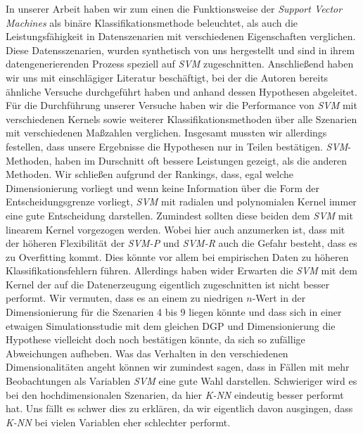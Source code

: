 \documentclass[
]{article}
\begin{document}
In unserer Arbeit haben wir zum einen die Funktionsweise der
\textit{Support Vector Machines} als binäre Klassifikationsmethode
beleuchtet, als auch die Leistungsfähigkeit in Datenszenarien mit
verschiedenen Eigenschaften verglichen. Diese Datensszenarien, wurden
synthetisch von uns hergestellt und sind in ihrem datengenerierenden
Prozess speziell auf \textit{SVM} zugeschnitten. Anschließend haben wir
uns mit einschlägiger Literatur beschäftigt, bei der die Autoren bereits
ähnliche Versuche durchgeführt haben und anhand dessen Hypothesen
abgeleitet. Für die Durchführung unserer Versuche haben wir die
Performance von \textit{SVM} mit verschiedenen Kernels sowie weiterer
Klassifikationsmethoden über alle Szenarien mit verschiedenen Maßzahlen
verglichen. \newline  Insgesamt mussten wir allerdings festellen, dass
unsere Ergebnisse die Hypothesen nur in Teilen bestätigen.
\textit{SVM}-Methoden, haben im Durschnitt oft bessere Leistungen
gezeigt, als die anderen Methoden. Wir schließen aufgrund der Rankings,
dass, egal welche Dimensionierung vorliegt und wenn keine Information
über die Form der Entscheidungsgrenze vorliegt, \textit{SVM} mit
radialen und polynomialen Kernel immer eine gute Entscheidung
darstellen. Zumindest sollten diese beiden dem \textit{SVM} mit linearem
Kernel vorgezogen werden. Wobei hier auch anzumerken ist, dass mit der
höheren Flexibilität der \textit{SVM-P} und \textit{SVM-R} auch die
Gefahr besteht, dass es zu Overfitting kommt. Dies könnte vor allem bei
empirischen Daten zu höheren Klassifikationsfehlern führen.\newline
Allerdings haben wider Erwarten die \textit{SVM} mit dem Kernel der auf
die Datenerzeugung eigentlich zugeschnitten ist nicht besser performt.
Wir vermuten, dass es an einem zu niedrigen \(n\)-Wert in der
Dimensionierung für die Szenarien 4 bis 9 liegen könnte und dass sich in
einer etwaigen Simulationsstudie mit dem gleichen DGP und
Dimensionierung die Hypothese vielleicht doch noch bestätigen könnte, da
sich so zufällige Abweichungen aufheben. Was das Verhalten in den
verschiedenen Dimensionalitäten angeht können wir zumindest sagen, dass
in Fällen mit mehr Beobachtungen als Variablen \textit{SVM} eine gute
Wahl darstellen. Schwieriger wird es bei den hochdimensionalen
Szenarien, da hier \textit{K-NN} eindeutig besser performt hat. Uns
fällt es schwer dies zu erklären, da wir eigentlich davon ausgingen,
dass \textit{K-NN} bei vielen Variablen eher schlechter performt.
\end{document}
